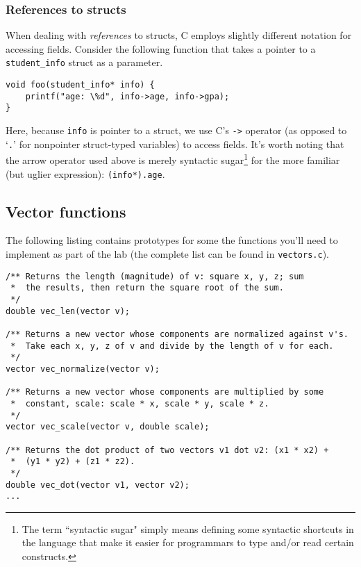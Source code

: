 \documentclass[12pt]{article}
\begin{document}
\subsubsection{References to structs}

When dealing with \textit{references} to structs, C employs slightly different notation for accessing fields. Consider the following function that takes a pointer to a \texttt{student\_info} struct as a parameter.

\begin{mdframed}[backgroundcolor=light-gray, innerleftmargin=10, innertopmargin=1,innerbottommargin=1,linecolor=light-gray]
\begin{lstlisting}
void foo(student_info* info) {
    printf("age: \%d", info->age, info->gpa);
}
\end{lstlisting}
\end{mdframed}

Here, because \texttt{info} is pointer to a struct, we use C's \texttt{->} operator (as opposed to `\texttt{.}' for nonpointer struct-typed variables) to access fields. It's worth noting that the arrow operator used above is merely syntactic sugar\footnote{The term ``syntactic sugar" simply means defining some syntactic shortcuts in the language that make it easier for programmars to type and/or read certain constructs.} for the more familiar (but uglier expression): \texttt{(info*).age}. 

\newpage
\subsection{Vector functions}

The following listing contains prototypes for some the functions you'll need to implement as part of the lab (the complete list can be found in \texttt{vectors.c}).

\begin{mdframed}[backgroundcolor=light-gray, innerleftmargin=10, innertopmargin=1,innerbottommargin=1,linecolor=light-gray]
\begin{lstlisting}
/** Returns the length (magnitude) of v: square x, y, z; sum
 *  the results, then return the square root of the sum.
 */
double vec_len(vector v);

/** Returns a new vector whose components are normalized against v's.
 *  Take each x, y, z of v and divide by the length of v for each.
 */
vector vec_normalize(vector v);

/** Returns a new vector whose components are multiplied by some 
 *  constant, scale: scale * x, scale * y, scale * z.
 */
vector vec_scale(vector v, double scale);
    
/** Returns the dot product of two vectors v1 dot v2: (x1 * x2) + 
 *  (y1 * y2) + (z1 * z2).
 */
double vec_dot(vector v1, vector v2);
...
\end{lstlisting}
\end{mdframed}
\end{document}
